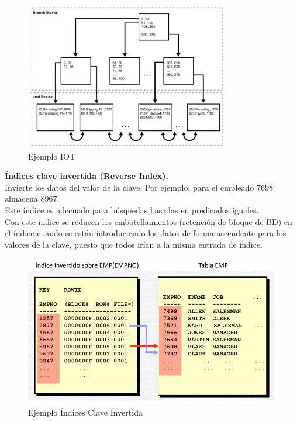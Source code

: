 \documentclass[a4paper,11pt]{article}
\begin{document}
\begin{figure}
\centering
\caption{Ejemplo IOT}
\includegraphics[scale=1,width=0.8\textwidth]{ejemplo_iot.png}
\end{figure}

\textbf{Índices clave invertida (Reverse Index).} \\

Invierte los datos del valor de la clave. Por ejemplo, para el empleado 7698 almacena 8967. \\

Este índice es adecuado para búsquedas basadas en predicados iguales. \\

Con este índice se reducen los embotellamientos (retención de bloque de BD) en el índice cuando se están introduciendo los datos de forma ascendente para los valores de la clave, puesto que todos irían a la misma entrada de índice. \\

\begin{figure}[h]
\centering
\caption{Ejemplo Índices Clave Invertida}
\includegraphics[scale=1,width=.8\textwidth]{tabla_emp.png}
\end{figure}
\end{document}

